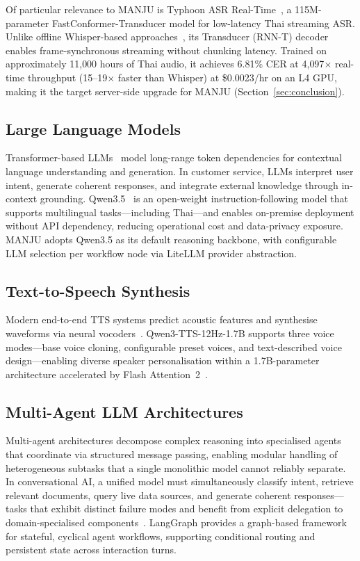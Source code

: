\documentclass[10pt, a4paper, twocolumn]{article}
\begin{document}
Of particular relevance to MANJU is Typhoon ASR Real-Time~\cite{sirichotedumrong2026typhoonasr}, a 115M-parameter FastConformer-Transducer model for low-latency Thai streaming ASR.
Unlike offline Whisper-based approaches~\cite{tipaksorn2024pathumma,aung2024thonburian}, its Transducer (RNN-T) decoder enables frame-synchronous streaming without chunking latency.
Trained on approximately 11{,}000 hours of Thai audio, it achieves 6.81\% CER at 4{,}097$\times$ real-time throughput (15--19$\times$ faster than Whisper) at \$0.0023/hr on an L4 GPU, making it the target server-side upgrade for MANJU (Section~\ref{sec:conclusion}).

\subsection{Large Language Models}
Transformer-based LLMs~\cite{vaswani2017attention} model long-range token dependencies for contextual language understanding and generation.
In customer service, LLMs interpret user intent, generate coherent responses, and integrate external knowledge through in-context grounding.
Qwen3.5~\cite{qwen2025qwen35} is an open-weight instruction-following model that supports multilingual tasks---including Thai---and enables on-premise deployment without API dependency, reducing operational cost and data-privacy exposure.
MANJU adopts Qwen3.5 as its default reasoning backbone, with configurable LLM selection per workflow node via LiteLLM provider abstraction.

\subsection{Text-to-Speech Synthesis}
Modern end-to-end TTS systems predict acoustic features and synthesise waveforms via neural vocoders~\cite{tan2021ttssurvey}.
Qwen3-TTS-12Hz-1.7B supports three voice modes---base voice cloning, configurable preset voices, and text-described voice design---enabling diverse speaker personalisation within a 1.7B-parameter architecture accelerated by Flash Attention~2~\cite{dao2022flashattention}.

\subsection{Multi-Agent LLM Architectures}
Multi-agent architectures decompose complex reasoning into specialised agents that coordinate via structured message passing, enabling modular handling of heterogeneous subtasks that a single monolithic model cannot reliably separate.
In conversational AI, a unified model must simultaneously classify intent, retrieve relevant documents, query live data sources, and generate coherent responses---tasks that exhibit distinct failure modes and benefit from explicit delegation to domain-specialised components~\cite{langgraph2024}.
LangGraph provides a graph-based framework for stateful, cyclical agent workflows, supporting conditional routing and persistent state across interaction turns.
\end{document}
